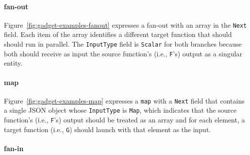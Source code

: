 \paragraph{fan-out}


Figure~\ref{fig:gadget-examples-fanout} expresses a fan-out with an array in
the \texttt{Next} field. Each item of the array identifies a different target
function that should should run in parallel. The \texttt{InputType} field is
\texttt{Scalar} for both branches because both should receive as input the
source function's (i.e., \texttt{F}'s) output as a singular entity.

\paragraph{map}


Figure~\ref{fig:gadget-examples-map} expresses a \texttt{map} with a
\texttt{Next} field that contains a single JSON object whose
\texttt{InputType} is \texttt{Map}, which indicates that the source function's
(i.e., \texttt{F}'s) output should be treated as an array and for each
element, a target function (i.e., \texttt{G}) should launch with that element
as the input.

\paragraph{fan-in}


